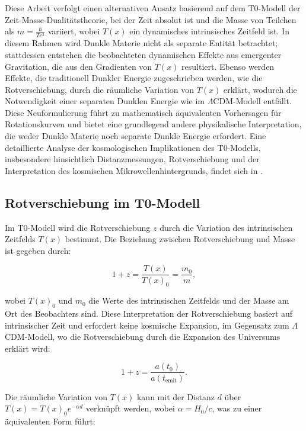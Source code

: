 \documentclass[a4paper,12pt]{article}
\newcommand{\Tfield}{T(x)}
\begin{document}
	Diese Arbeit verfolgt einen alternativen Ansatz basierend auf dem T0-Modell der Zeit-Masse-Dualitätstheorie, bei der Zeit absolut ist und die Masse von Teilchen als \( m = \frac{\hbar}{T c^2} \) variiert, wobei \( \Tfield \) ein dynamisches intrinsisches Zeitfeld ist. In diesem Rahmen wird Dunkle Materie nicht als separate Entität betrachtet; stattdessen entstehen die beobachteten dynamischen Effekte aus emergenter Gravitation, die aus den Gradienten von \( \Tfield \) resultiert. Ebenso werden Effekte, die traditionell Dunkler Energie zugeschrieben werden, wie die Rotverschiebung, durch die räumliche Variation von \( \Tfield \) erklärt, wodurch die Notwendigkeit einer separaten Dunklen Energie wie im \(\Lambda\)CDM-Modell entfällt. Diese Neuformulierung führt zu mathematisch äquivalenten Vorhersagen für Rotationskurven und bietet eine grundlegend andere physikalische Interpretation, die weder Dunkle Materie noch separate Dunkle Energie erfordert. Eine detaillierte Analyse der kosmologischen Implikationen des T0-Modells, insbesondere hinsichtlich Distanzmessungen, Rotverschiebung und der Interpretation des kosmischen Mikrowellenhintergrunds, findet sich in \cite{pascher_messdifferenzen_2025}.
	
	\subsection{Rotverschiebung im T0-Modell}
	
	Im T0-Modell wird die Rotverschiebung \( z \) durch die Variation des intrinsischen Zeitfelds \( \Tfield \) bestimmt. Die Beziehung zwischen Rotverschiebung und Masse ist gegeben durch:
	
	\begin{equation}
		1 + z = \frac{\Tfield}{\Tfield_0} = \frac{m_0}{m},
	\end{equation}
	
	wobei \( \Tfield_0 \) und \( m_0 \) die Werte des intrinsischen Zeitfelds und der Masse am Ort des Beobachters sind. Diese Interpretation der Rotverschiebung basiert auf intrinsischer Zeit und erfordert keine kosmische Expansion, im Gegensatz zum \(\Lambda\)CDM-Modell, wo die Rotverschiebung durch die Expansion des Universums erklärt wird:
	
	\begin{equation}
		1 + z = \frac{a(t_0)}{a(t_{\text{emit}})}.
	\end{equation}
	
	Die räumliche Variation von \( \Tfield \) kann mit der Distanz \( d \) über \( \Tfield = \Tfield_0 e^{-\alpha d} \) verknüpft werden, wobei \( \alpha = H_0/c \), was zu einer äquivalenten Form führt:
	
\end{document}
